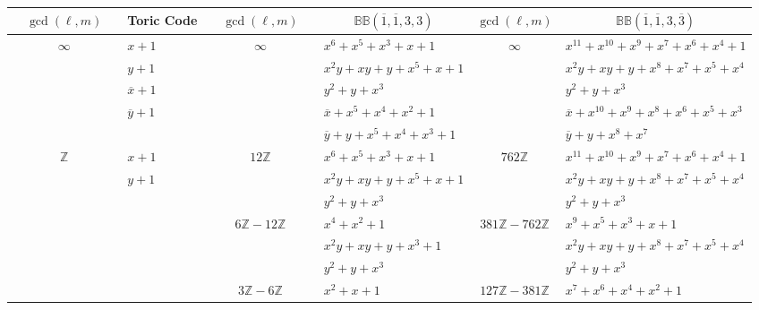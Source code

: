 \documentclass[aps,prl,english,superscriptaddress,twocolumn,tightenlines,showpacs,longbibliography,floatfix,amsfonts]{revtex4-2}
\begin{document}
\begin{table}[]
	\begin{tabular}{clcl|c|l|}
		\hline
		\multicolumn{1}{|c|}{$\quad\gcd(\ell,m)\quad$} & \multicolumn{1}{c|}{Toric Code} & \multicolumn{1}{c|}{$\quad\gcd(\ell,m)\quad$} & \multicolumn{1}{c|}{$\mathbb{BB}(\overline{1}, \overline{1},3,3)$} & $\gcd(\ell,m)$ & \multicolumn{1}{c|}{$\mathbb{BB}(\overline{1},\overline{1}, 3, \overline{3})$} \\ \hline
		\multicolumn{1}{|c|}{\multirow{5}{*}{$\infty$}} & \multicolumn{1}{l|}{$x+1$} & \multicolumn{1}{c|}{\multirow{5}{*}{$\infty$}} & $x^6+x^5+x^3+x+1$ & \multirow{5}{*}{$\infty$} & $x^{11}+x^{10}+x^9+x^7+x^6+x^4+1$ \\
		\multicolumn{1}{|c|}{} & \multicolumn{1}{l|}{$y+1$} & \multicolumn{1}{c|}{} & $x^2y+xy+y+x^5+x+1$ &  & $x^2y+xy+y+x^8+x^7+x^5+x^4$ \\
		\multicolumn{1}{|c|}{} & \multicolumn{1}{l|}{$\overline{x}+1$} & \multicolumn{1}{c|}{} & $y^2+y+x^3$ &  & $y^2+y+x^3$ \\
		\multicolumn{1}{|c|}{} & \multicolumn{1}{l|}{$\overline{y}+1$} & \multicolumn{1}{c|}{} & $\overline{x}+x^5+x^4+x^2+1$ &  & $\overline{x}+x^{10}+x^9+x^8+x^6+x^5+x^3$ \\
		\multicolumn{1}{|c|}{} & \multicolumn{1}{l|}{} & \multicolumn{1}{c|}{} & $\overline{y}+y+x^5+x^4+x^3+1$ &  & $\overline{y}+y+x^8+x^7$ \\ \hline
		\multicolumn{1}{|c|}{\multirow{3}{*}{$\mathbb{Z}$}} & \multicolumn{1}{l|}{$x+1$} & \multicolumn{1}{c|}{\multirow{3}{*}{$12\mathbb{Z}$}} & $x^6+x^5+x^3+x+1$ & \multirow{3}{*}{$762\mathbb{Z}$} & $x^{11}+x^{10}+x^9+x^7+x^6+x^4+1$ \\
		\multicolumn{1}{|c|}{} & \multicolumn{1}{l|}{$y+1$} & \multicolumn{1}{c|}{} & $x^2y+xy+y+x^5+x+1$ &  & $x^2y+xy+y+x^8+x^7+x^5+x^4$ \\
		\multicolumn{1}{|c|}{} & \multicolumn{1}{l|}{} & \multicolumn{1}{c|}{} & $y^2+y+x^3$ &  & $y^2+y+x^3$ \\ \hline
		& \multicolumn{1}{l|}{} & \multicolumn{1}{c|}{\multirow{3}{*}{$6\mathbb{Z}-12\mathbb{Z}$}} & $x^4+x^2+1$ & \multirow{3}{*}{$381\mathbb{Z}-762\mathbb{Z}$} & $x^9+x^5+x^3+x+1$ \\
		& \multicolumn{1}{l|}{} & \multicolumn{1}{c|}{} & $x^2y+xy+y+x^3+1$ &  & $x^2y+xy+y+x^8+x^7+x^5+x^4$ \\
		& \multicolumn{1}{l|}{} & \multicolumn{1}{c|}{} & $y^2+y+x^3$ &  & $y^2+y+x^3$ \\ \cline{3-6} 
		& \multicolumn{1}{l|}{} & \multicolumn{1}{c|}{\multirow{2}{*}{$3\mathbb{Z}-6\mathbb{Z}$}} & $x^2+x+1$ & \multirow{2}{*}{$127\mathbb{Z}-381\mathbb{Z}$} & $x^7+x^6+x^4+x^2+1$ \\

\end{tabular}
\end{table}
\end{document}
